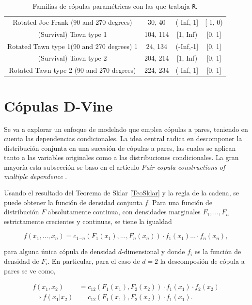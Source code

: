 \begin{table}[H]
\begin{tabular}{||c|c|c|c||}
Rotated Joe-Frank (90 and 270 degrees)	    & 30, 40	& (-Inf,-1] & [-1, 0)   \\
(Survival) Tawn type 1	                    & 104, 114	& [1, Inf)	& [0, 1]    \\
Rotated Tawn type 1(90 and 270 degrees)	1   & 24, 134	& (-Inf,-1]	& [0, 1]    \\
(Survival) Tawn type 2	                    & 204, 214	& [1, Inf)	& [0, 1]    \\ 
Rotated Tawn type 2 (90 and 270 degrees)	& 224, 234	& (-Inf,-1]	& [0, 1]    \\ \hline \hline
    \end{tabular}
    \caption{Familias de cópulas paramétricas con las que trabaja \texttt{R}.}
    \label{tab:family_set}
\end{table}


\section{Cópulas D-Vine}\label{DVines}

Se va a explorar un enfoque de modelado que emplea cópulas a pares, teniendo en cuenta las dependencias condicionales. La idea central radica en descomponer la distribución conjunta en una sucesión de cópulas a pares, las cuales se aplican tanto a las variables originales como a las distribuciones condicionales. La gran mayoría esta subsección se baso en el artículo \textit{Pair-copula constructions of multiple dependence} \cite{PairCopula}.

Usando el resultado del Teorema de Sklar \ref{TeoSklar} y la regla de la cadena, se puede obtener la función de densidad conjunta $f$. Para una función de distribución $F$ absolutamente continua, con densidades marginales $F_1, \dots, F_n$ estrictamente crecientes y continuas, se tiene la igualdad

\begin{equation}\label{conjunta}
    f\left( x_1, \dots, x_n\right)=  c_{1 \cdots n} (F_1\left(x_1\right), \ldots, F_n\left(x_n\right) ) \cdot f_1\left(x_1\right) \dots \cdot f_n\left(x_n\right),
\end{equation}

para alguna única cópula de densidad $d$-dimensional y donde $f_i$ es la función de densidad de $F_i$. En particular, para el caso de $d = 2$ la descomposión de cópula a pares se ve como,

\begin{equation} \label{eq1}
    \begin{split}
        f (x_1, x_2) & = c_{12}(F_1(x_1), F_2(x_2)) \cdot f_1(x_1) \cdot f_2(x_2) \\
      \Rightarrow f\left(x_1 | x_2\right) & = c_{12}(F_1\left(x_1\right), F_2\left(x_2\right)) \cdot f_1\left(x_1\right).
    \end{split}
\end{equation}

